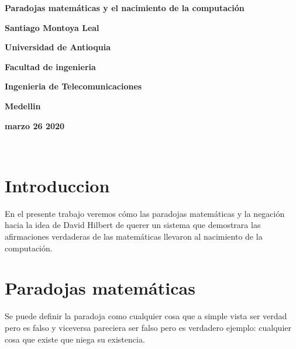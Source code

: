 \documentclass{article}
\begin{document}
\begin{center}
\bf{\sc\Huge Paradojas matemáticas y el nacimiento de la computación}\\
\end{center}
\vspace{80pt}
\begin{center}
\bf{\sc\Huge Santiago Montoya Leal }\\
\end{center}
\vspace{80pt}
\begin{center}
\bf{\sc\Huge Universidad de Antioquia}\\
\end{center}
\vspace{80pt}
\begin{center}
\bf{\sc\Huge Facultad de ingenieria}\\
\end{center}
\vspace{20pt}
\begin{center}
\bf{\sc\Huge Ingenieria de Telecomunicaciones}\\
\end{center}
\vspace{20pt}
\begin{center}
\bf{\sc\Huge Medellin}
\end{center}
\begin{center}
\bf{\sc\Huge marzo 26 2020}\\
\end{center}\
\newpage

\section{Introduccion}
\large

En el presente trabajo veremos cómo las paradojas matemáticas y la negación hacia la idea de David Hilbert de querer un sistema que  demostrara las afirmaciones verdaderas de las matemáticas llevaron al nacimiento de la computación.

\section{Paradojas matemáticas}

\large
Se puede definir la paradoja como cualquier cosa que a simple vista ser verdad pero es falso y viceversa  pareciera ser falso pero es verdadero ejemplo: cualquier cosa que existe que niega su existencia.
\end{document}
